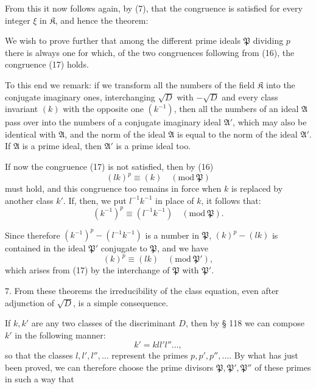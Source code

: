 From this it now follows again, by (7), that the congruence %
is satisfied for every integer $\xi$ in $\mathfrak K$, and hence the theorem:


We wish to prove further that among the different
prime ideals $\mathfrak P$ dividing $p$ there is always one for which,
of the two congruences following from (16), the congruence
(17) holds.

To this end we remark: if we transform all the numbers of the
field $\mathfrak K$ into the conjugate imaginary ones, interchanging
$\sqrt{D}$ with $-\sqrt{D}$ and every class invariant $(k)$ with the opposite one $(k^{-1})$, then all the numbers of an
ideal $\mathfrak A$ pass over into the numbers of a conjugate imaginary ideal $\mathfrak A'$,
which may also be identical with $\mathfrak A$, and the norm of the
ideal $\mathfrak A$ is equal to the norm of the ideal $\mathfrak A'$. If $\mathfrak A$ is a prime ideal,
then $\mathfrak A'$ is a prime ideal too.

If now the congruence (17) is not satisfied, then by (16)
\[
(lk)^p \equiv (k) \quad (\mathrm{mod}\ \mathfrak P)
\]
must hold, and this congruence too remains in force when $k$ is
replaced by another class $k'$. If, then, we put $l^{-1}k^{-1}$ in
place of $k$, it follows that:
\[
(k^{-1})^p \equiv (l^{-1}k^{-1}) \quad (\mathrm{mod}\ \mathfrak P).
\]

Since therefore $(k^{-1})^p - (l^{-1}k^{-1})$ is a number in $\mathfrak P$, $(k)^p - (lk)$
is contained in the ideal $\mathfrak P'$ conjugate to $\mathfrak P$, and we have
\[
(k)^p \equiv (lk) \quad (\mathrm{mod}\ \mathfrak P'),
\]
which arises from (17) by the interchange of $\mathfrak P$ with $\mathfrak P'$.

7. From these theorems the irreducibility of the class equation, even after adjunction of $\sqrt{D}$, is a simple consequence.

If $k, k'$ are any two classes of the discriminant $D$, then
by § 118 we can compose $k'$ in the following manner:
\[
k' = k l l' l'' \ldots,
\]
so that the classes $l, l', l'', \ldots$ represent the primes $p, p', p'', \ldots$.
By what has just been proved, we can therefore choose
the prime divisors $\mathfrak P, \mathfrak P', \mathfrak P''$ of these primes in such a way that

